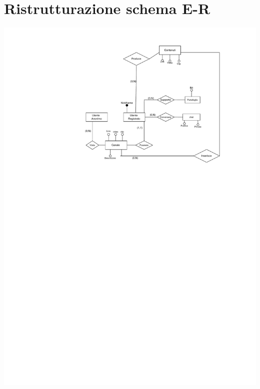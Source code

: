 \section{Ristrutturazione schema E-R}
\includegraphics[width=\textwidth]{resources/e_r_ridotto.pdf}


